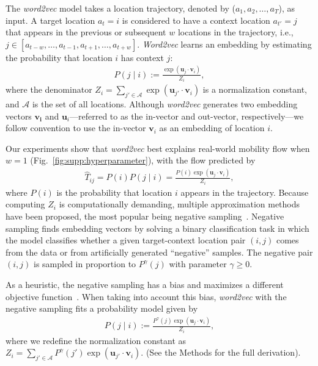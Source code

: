 \documentclass[12pt]{article} %
\def\given{\mid}
\def\ie{i.e.,~}
\begin{document}
The {\it word2vec} model takes a location trajectory, denoted by ($a_{1}, a_{2}, \ldots, a_{T}$), as input.
A target location $a_t=i$ is considered to have a context location $a_{t'}=j$ that appears in the previous or subsequent $w$ locations in the trajectory, \ie  $j \in [a_{t-w}, \ldots, a_{t-1}, a_{t+1},\ldots, a_{t+w}]$.
	{\it Word2vec} learns an embedding by estimating the probability that location $i$ has context $j$:
\begin{align}
	P\left(j \given i \right):= \frac{\exp(\bm{u}_j \cdot \bm{v}_{i})}{Z_i}, \label{eq:prob_w2v_ng}
\end{align}
where the denominator $Z_i=\sum_{j' \in \mathcal{A}} \exp(\bm{u}_{j'} \cdot \bm{v}_{i})$ is a normalization constant, and $\mathcal{A}$ is the set of all locations.
Although {\it word2vec} generates two embedding vectors $\bm{v_i}$ and $\bm{u}_i$---referred to as the in-vector and out-vector, respectively---we follow convention to use the in-vector $\bm{v}_i$ as an embedding of location $i$.

Our experiments show that {\it word2vec} best explains real-world mobility flow when $w=1$ (Fig.~\ref{fig:supp:hyperparameter}), with the flow predicted by
\begin{align}
	\label{eq:flow_w2v}
	\hat{T}_{ij} = P(i) P(j\given i) = \frac{P(i)\exp(\bm{u}_j \cdot \bm{v}_{i})}{Z_i},
\end{align}
where $P(i)$ is the probability that location $i$ appears in the trajectory.
Because computing $Z_i$ is computationally demanding, multiple approximation methods have been proposed, the most popular being negative sampling~\autocite{mikolov2013word2vec}.
Negative sampling finds embedding vectors by solving a binary classification task in which the model classifies whether a given target-context location pair $(i, j)$ comes from the data or from artificially generated ``negative'' samples.
The negative pair $(i,j)$ is sampled in proportion to $P^\gamma(j)$ with parameter $\gamma \geq 0$.

As a heuristic, the negative sampling has a bias and maximizes a different objective function~\autocite{Gutmann2010}.
When taking into account this bias, {\it word2vec} with the negative sampling fits a probability model given by
\begin{align}
	P\left(j \given i \right):= \frac{P^ \gamma(j) \exp(\bm{u}_j \cdot \bm{v}_{i})}{Z_i}, \label{eq:prob_w2v_ng0}
\end{align}
where we redefine the normalization constant as $Z_i=\sum_{j' \in \mathcal{A}} P^ \gamma (j') \exp(\bm{u}_{j'} \cdot \bm{v}_{i})$. (See the Methods for the full derivation).
\end{document}
